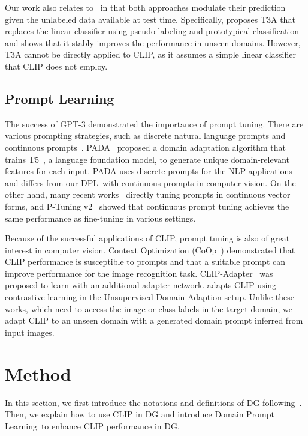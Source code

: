 \documentclass[letterpaper]{article} \usepackage[]{aaai23}
\newcommand{\dplshort}{DPL}
\newcommand{\dpllong}{Domain Prompt Learning}
\begin{document}
Our work also relates to~\cite{iwasawa2021testtime} in that both approaches modulate their prediction given the unlabeled data available at test time. 
Specifically, \cite{iwasawa2021testtime} proposes T3A that replaces the linear classifier using pseudo-labeling and prototypical classification and shows that it stably improves the performance in unseen domains. 
However, T3A cannot be directly applied to CLIP, as it assumes a simple linear classifier that CLIP does not employ.

\subsection{Prompt Learning}
\label{sec:prompt}
The success of GPT-3 demonstrated the importance of prompt tuning. 
There are various prompting strategies, such as discrete natural language prompts and continuous prompts~\cite{liu2021pretrain}.
PADA~\cite{bendavid2021pada} proposed a domain adaptation algorithm that trains T5~\cite{raffel2019exploring}, a language foundation model, to generate unique domain-relevant features for each input.
PADA uses discrete prompts for the NLP applications and differs from our \dplshort~with continuous prompts in computer vision.
On the other hand, many recent works~\cite{li2021prefix,lester2021power} directly tuning prompts in continuous vector forms, and P-Tuning v2~\cite{liu2021ptuning} showed that continuous prompt tuning achieves the same performance as fine-tuning in various settings.

Because of the successful applications of CLIP, prompt tuning is also of great interest in computer vision. 
Context Optimization (CoOp~\cite{zhou2021coop}) demonstrated that CLIP performance is susceptible to prompts and that a suitable prompt can improve performance for the image recognition task.
CLIP-Adapter~\cite{gao2021clipadapter} was proposed to learn with an additional adapter network.
\cite{ge2022domain} adapts CLIP using contrastive learning in the Unsupervised Domain Adaption setup.
Unlike these works, which need to access the image or class labels in the target domain, 
we adapt CLIP to an unseen domain with a generated domain prompt inferred from input images. 

\section{Method}


In this section, we first introduce the notations and definitions of DG following~\cite{wang2021generalizing}.
Then, we explain how to use CLIP in DG and introduce \dpllong~to enhance CLIP performance in DG.
\end{document}
